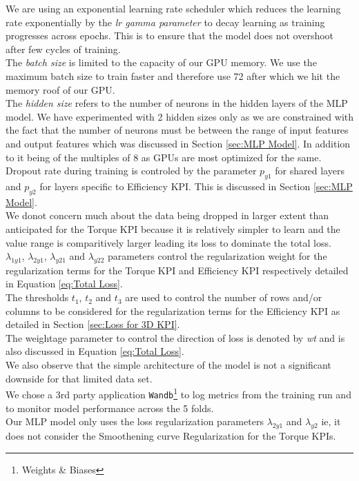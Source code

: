 \documentclass{report} %
\begin{document}
We are using an exponential learning rate scheduler which reduces the learning rate exponentially by the \textit{lr gamma parameter} to decay learning as training progresses across epochs.
This is to ensure that the model does not overshoot after few cycles of training.\\
The \textit{batch size} is limited to the capacity of our \ac{GPU} memory. We use the maximum batch size to train faster and therefore use 72 after which we hit the memory roof of our GPU.\\
The \textit{hidden size} refers to the number of neurons in the hidden layers of the \ac{MLP} model. 
We have experimented with 2 hidden sizes only as we are constrained with the fact that the number of neurons must be between the range of input features and output features which was discussed in Section \ref{sec:MLP Model}.
In addition to it being of the multiples of 8 as \ac{GPU}s are most optimized for the same.
Dropout rate during training is controled by the parameter \textit{$p_{y1}$} for shared layers and \textit{$p_{y2}$} for layers specific to Efficiency \ac{KPI}. This is discussed in Section \ref{sec:MLP Model}. \\
We donot concern much about the data being dropped in larger extent than anticipated for the Torque \ac{KPI} because it is relatively simpler to learn and the value range is comparitively larger leading its loss to dominate the total loss.\\
\textit{$\lambda_{1y1}$}, \textit{$\lambda_{2y1}$}, \textit{$\lambda_{y21}$} and \textit{$\lambda_{y22}$} parameters control the regularization weight for the regularization terms for the Torque \ac{KPI} and Efficiency \ac{KPI} respectively detailed in Equation \ref{eq:Total Loss}.\\
The thresholds \textit{$t_{1}$}, \textit{$t_{2}$} and \textit{$t_{3}$} are used to control the number of rows and/or columns to be considered for the regularization terms for the Efficiency \ac{KPI} as detailed in Section \ref{sec:Loss for 3D KPI}.\\
The weightage parameter to control the direction of loss is denoted by \textit{wt} and is also discussed in Equation \ref{eq:Total Loss}.\\

We also observe that the simple architecture of the model is not a significant downside for that limited data set. \\

We chose a 3rd party application \texttt{Wandb}\footnote{Weights \& Biases} to log metrics from the training run and to monitor model performance across the 5 folds. \\
Our \ac{MLP} model only uses the loss regularization parameters \textit{$\lambda_{2y1}$} and \textit{$\lambda_{y2}$} ie, it does not consider the Smoothening curve Regularization for the Torque \ac{KPI}s.
\end{document}

